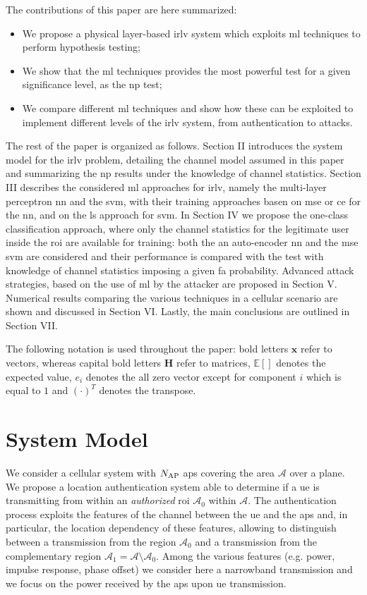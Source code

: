 \documentclass[draftcls,onecolumn,12pt]{IEEEtran}
\begin{document}
The contributions of this paper are here summarized:
\begin{itemize}
    \item We propose a  physical layer-based \ac{irlv} system which exploits \ac{ml} techniques to perform hypothesis testing;
    \item We show that the \ac{ml} techniques provides the most powerful test for a given significance level, as the \ac{np} test;
    \item We compare different \ac{ml} techniques and show how these can be exploited to implement different levels of the \ac{irlv} system, from authentication to attacks.
\end{itemize}

The rest of the paper is organized as follows. Section II introduces the system model for the \ac{irlv} problem, detailing the channel model assumed in this paper and summarizing the \ac{np} results under the knowledge of channel statistics. Section III describes the considered \ac{ml} approaches for \ac{irlv}, namely the multi-layer perceptron \ac{nn} and the \ac{svm}, with their training approaches basen on \ac{mse} or \ac{ce} for the \ac{nn}, and on the \ac{ls} approach for \ac{svm}. In Section IV we propose the one-class classification approach, where only the channel statistics for the legitimate user inside the \ac{roi} are available for training: both the an auto-encoder \ac{nn} and the \ac{mse} \ac{svm} are considered and their performance is compared with the test with knowledge of channel statistics imposing a given \ac{fa} probability. Advanced attack strategies, based on the use of \ac{ml} by the attacker are proposed in Section V. Numerical results comparing the various techniques in a cellular scenario are shown and discussed in Section VI. Lastly, the main conclusions are outlined in Section VII.

The following notation is used throughout the paper: bold letters $\bm{x}$ refer to vectors, whereas capital bold letters $\bm{H}$ refer to matrices, $\mathbb{E}[]$ denotes the expected value, $e_i$ denotes the all zero vector except for component $i$ which is equal to $1$ and $(\cdot)^T$ denotes the transpose.

\section{System Model}

We consider a cellular system with $N_{\rm AP}$ \acp{ap} covering the area $\mathcal{A}$ over a plane. We propose a location authentication system able to determine if a \ac{ue} is transmitting from within an {\em authorized} \ac{roi} $\mathcal{A}_0$ within   $\mathcal{A}$. The authentication process exploits the features of the channel between the \ac{ue} and the \acp{ap} and, in particular, the location dependency of these features, allowing to distinguish between a transmission from the region $\mathcal{A_0}$ and a transmission from the complementary region $\mathcal{A}_1=\mathcal{A} \setminus \mathcal{A}_0$. Among the various features (e.g. power, impulse response, phase offset) we consider here a narrowband transmission and we focus on the power received by the \acp{ap} upon \ac{ue} transmission.
\end{document}

